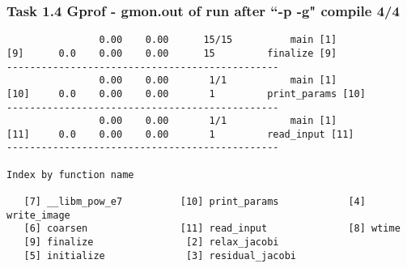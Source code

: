 \begin{frame}[fragile]
\frametitle{Task 1.4 Gprof - gmon.out of run after ``-p -g" compile 4/4}
\begin{lstlisting}
                0.00    0.00      15/15          main [1]
[9]      0.0    0.00    0.00      15         finalize [9]
-----------------------------------------------
                0.00    0.00       1/1           main [1]
[10]     0.0    0.00    0.00       1         print_params [10]
-----------------------------------------------
                0.00    0.00       1/1           main [1]
[11]     0.0    0.00    0.00       1         read_input [11]
-----------------------------------------------

Index by function name

   [7] __libm_pow_e7          [10] print_params            [4] write_image
   [6] coarsen                [11] read_input              [8] wtime
   [9] finalize                [2] relax_jacobi
   [5] initialize              [3] residual_jacobi
\end{lstlisting}
\end{frame}
